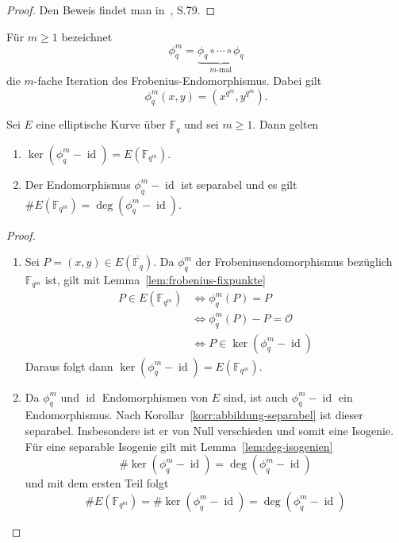 \begin{proof}
    Den Beweis findet man in~\cite{silverman09}, S.79.
\end{proof}
Für $m\geq 1$ bezeichnet
\[
    \phi_q^m
    =
    \underbrace{\phi_q\circ\cdots\circ\phi_q}_{m\text{-mal}}
\]
die $m$-fache Iteration des Frobenius-Endomorphismus. Dabei gilt
\[
    \phi_q^m(x,y)
    =
    (x^{q^m},y^{q^m}).
\]

\begin{proposition}\label{prop:frobenius-erweiterungskoerper}
    Sei $E$ eine elliptische Kurve über $\mathbb{F}_q$ und sei
    $m\geq 1$. Dann gelten
    \begin{enumerate}
        \item \(\ker(\phi_q^m-\operatorname{id})=E(\mathbb{F}_{q^m})\).
        \item Der Endomorphismus \(\phi^m_q-\operatorname{id}\) ist separabel und es gilt $\#E(\mathbb{F}_{q^m})=\deg(\phi_q^m-\operatorname{id})$.
    \end{enumerate}
\end{proposition}
\begin{proof}
    \begin{enumerate}
        \item Sei $P=(x,y)\in E(\overline{\mathbb{F}_q})$. Da $\phi_q^m$ der Frobeniusendomorphismus bezüglich
              $\mathbb{F}_{q^m}$ ist, gilt mit Lemma~\ref{lem:frobenius-fixpunkte}
              \begin{align*}
                  P\in E(\mathbb{F}_{q^m}) & \iff \phi^m_q(P)=P                        \\
                                           & \iff \phi^m_q(P)-P=\mathcal{O}            \\
                                           & \iff P\in\ker(\phi^m_q-\operatorname{id})
              \end{align*}
              Daraus folgt dann \(\ker(\phi_q^m-\operatorname{id})=E(\mathbb{F}_{q^m})\).

        \item Da $\phi_q^m$ und $\operatorname{id}$ Endomorphismen von $E$ sind, ist auch \(\phi_q^m-\operatorname{id}\) ein Endomorphismus. Nach Korollar~\ref{korr:abbildung-separabel} ist dieser separabel. Insbesondere ist er von Null verschieden und somit eine Isogenie. Für eine separable Isogenie gilt mit Lemma~\ref{lem:deg-isogenien}
              \[
                  \#\ker(\phi^m_q-\operatorname{id}) = \deg(\phi^m_q-\operatorname{id})
              \]
              und mit dem ersten Teil folgt
              \[
                  \#E(\mathbb{F}_{q^m})= \#\ker(\phi_q^m-\operatorname{id})=\deg(\phi_q^m-\operatorname{id})
              \]
    \end{enumerate}
\end{proof}

